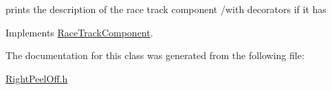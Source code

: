 prints the description of the race track component /with decorators if it has 

Implements \mbox{\hyperlink{class_race_track_component_a02a8d9520cfd80f31dd94b5fa1e76d47}{Race\+Track\+Component}}.



The documentation for this class was generated from the following file\+:\begin{DoxyCompactItemize}
\item 
\mbox{\hyperlink{_right_peel_off_8h}{Right\+Peel\+Off.\+h}}\end{DoxyCompactItemize}
